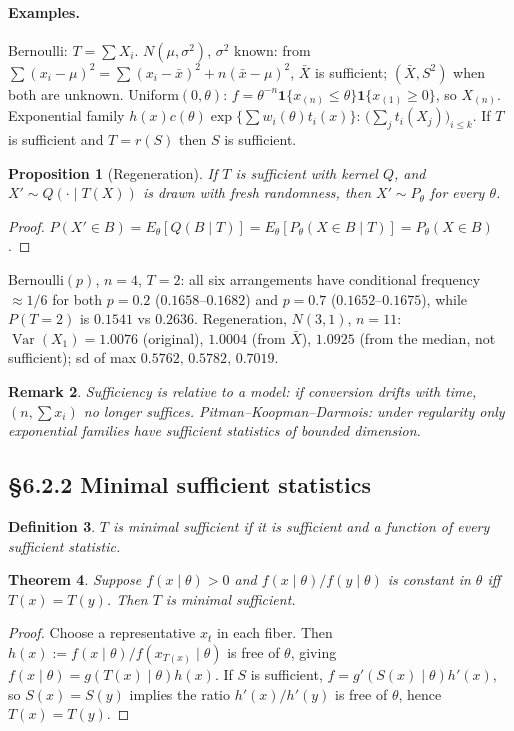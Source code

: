 \documentclass[11pt]{article}
\newtheorem{theorem}{Theorem}[section]
\newtheorem{definition}[theorem]{Definition}
\newtheorem{remark}[theorem]{Remark}
\newtheorem{proposition}[theorem]{Proposition}
\DeclareMathOperator{\Var}{Var}\DeclareMathOperator{\Cov}{Cov}\DeclareMathOperator{\E}{E}
\newcommand{\ind}{\mathbf 1}
\begin{document}
\paragraph{Examples.} Bernoulli: $T=\sum X_i$. $N(\mu,\sigma^2)$, $\sigma^2$ known: from $\sum(x_i-\mu)^2=\sum(x_i-\bar x)^2+n(\bar x-\mu)^2$, $\bar X$ is sufficient; $(\bar X,S^2)$ when both are unknown. Uniform$(0,\theta)$: $f=\theta^{-n}\ind\{x_{(n)}\le\theta\}\ind\{x_{(1)}\ge0\}$, so $X_{(n)}$. Exponential family $h(x)c(\theta)\exp\{\sum w_i(\theta)t_i(x)\}$: $\big(\sum_jt_i(X_j)\big)_{i\le k}$. If $T$ is sufficient and $T=r(S)$ then $S$ is sufficient.
\begin{proposition}[Regeneration]
If $T$ is sufficient with kernel $Q$, and $X'\sim Q(\cdot\mid T(X))$ is drawn with fresh randomness, then $X'\sim P_\theta$ for every $\theta$.
\end{proposition}
\begin{proof}
$P(X'\in B)=E_\theta[Q(B\mid T)]=E_\theta[P_\theta(X\in B\mid T)]=P_\theta(X\in B)$.
\end{proof}
\begin{simbox}
Bernoulli$(p)$, $n=4$, $T=2$: all six arrangements have conditional frequency $\approx1/6$ for both $p=0.2$ ($0.1658$--$0.1682$) and $p=0.7$ ($0.1652$--$0.1675$), while $P(T=2)$ is $0.1541$ vs $0.2636$. Regeneration, $N(3,1)$, $n=11$: $\Var(X_1)=1.0076$ (original), $1.0004$ (from $\bar X$), $1.0925$ (from the median, not sufficient); sd of max $0.5762,\,0.5782,\,0.7019$.
\end{simbox}
\begin{remark}
Sufficiency is relative to a model: if conversion drifts with time, $(n,\sum x_i)$ no longer suffices. Pitman--Koopman--Darmois: under regularity only exponential families have sufficient statistics of bounded dimension.
\end{remark}

\subsection{\S6.2.2 Minimal sufficient statistics}
\begin{definition}
$T$ is \emph{minimal sufficient} if it is sufficient and a function of every sufficient statistic.
\end{definition}
\begin{theorem}
Suppose $f(x\mid\theta)>0$ and $f(x\mid\theta)/f(y\mid\theta)$ is constant in $\theta$ iff $T(x)=T(y)$. Then $T$ is minimal sufficient.
\end{theorem}
\begin{proof}
Choose a representative $x_t$ in each fiber. Then $h(x):=f(x\mid\theta)/f(x_{T(x)}\mid\theta)$ is free of $\theta$, giving $f(x\mid\theta)=g(T(x)\mid\theta)h(x)$. If $S$ is sufficient, $f=g'(S(x)\mid\theta)h'(x)$, so $S(x)=S(y)$ implies the ratio $h'(x)/h'(y)$ is free of $\theta$, hence $T(x)=T(y)$.
\end{proof}
\end{document}
